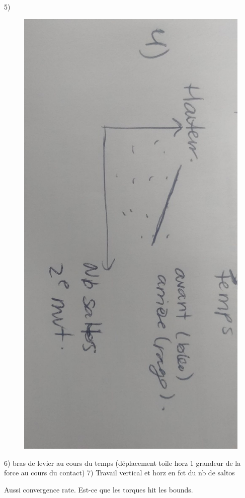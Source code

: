 5) 
\begin{figure}[h!]
\centering
\includegraphics[width=0.5\linewidth, angle =90]{figures/ALaMain_3.jpg}
\end{figure}
6) bras de levier au cours du temps (déplacement toile horz 1 grandeur de la force au cours du contact)
7) Travail vertical et horz en fct du nb de saltos


Aussi
convergence rate.
Est-ce que les torques hit les bounds.

